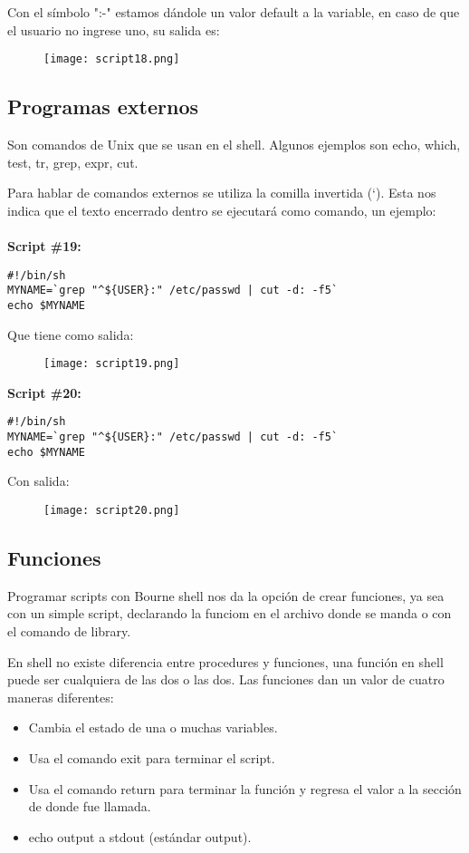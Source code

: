 \documentclass[a4paper]{article}
\begin{document}
Con el símbolo ":-" estamos dándole un valor default a la variable, en caso de que el usuario no ingrese uno, su salida es:
\begin{figure}[h!]
  \texttt{[image: script18.png]}
  \centering
  \label{fig:31}
\end{figure}

\subsection{Programas externos}
Son comandos de Unix que se usan en el shell. Algunos ejemplos son echo, which, test, tr, grep, expr, cut. 

Para hablar de comandos externos se utiliza la comilla invertida (`). Esta nos indica que el texto encerrado dentro se ejecutará como comando, un ejemplo:\\
\\
\textbf{Script \#19:}
\begin{verbatim}
#!/bin/sh
MYNAME=`grep "^${USER}:" /etc/passwd | cut -d: -f5`
echo $MYNAME
\end{verbatim}

Que tiene como salida:
 \begin{figure}[h!]
  \texttt{[image: script19.png]}
  \centering
  \label{fig:32}
\end{figure}

\textbf{Script \#20:}
\begin{verbatim}
#!/bin/sh
MYNAME=`grep "^${USER}:" /etc/passwd | cut -d: -f5`
echo $MYNAME
\end{verbatim}

Con salida: 
\begin{figure}[h!]
  \texttt{[image: script20.png]}
  \centering
  \label{fig:33}
\end{figure}


\subsection{Funciones}
Programar scripts con Bourne shell nos da la opción de crear funciones, ya sea con un simple script, declarando la funciom en el archivo donde se manda o con el comando de library.

En shell no existe diferencia entre procedures y funciones, una función en shell puede ser cualquiera de las dos o las dos. Las funciones dan un valor de cuatro maneras diferentes: 
\begin{itemize}
\item Cambia el estado de una o muchas variables. 
\item Usa el comando exit para terminar el script.
\item Usa el comando return para terminar la función y regresa el valor a la sección de donde fue llamada.
\item echo output a stdout (estándar output).
\end{itemize}
\end{document}
